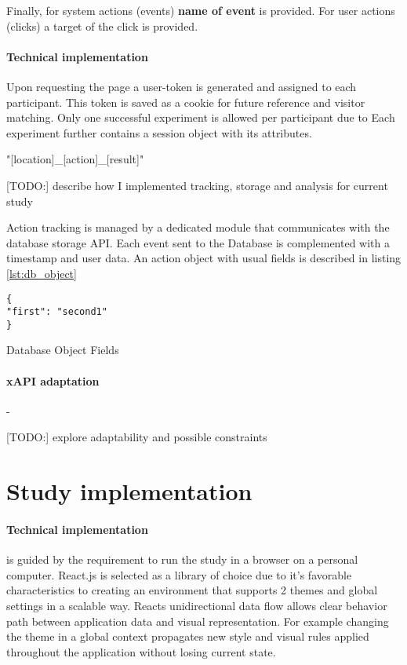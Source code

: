 	Finally, for system actions (events) \textbf{name of event} is provided. For user actions (clicks) a target of the click is provided.
	

	

		
		\paragraph{Technical implementation}
		
		Upon requesting the page a user-token is generated and assigned to each participant. This token is saved as a cookie for future reference and visitor matching. Only one successful experiment is allowed per participant due to 
		Each experiment further contains a session object with its attributes. 
		
		"[location]\_[action]\_[result]"
		
		[TODO:] describe how I implemented tracking, storage and analysis for current study
		
		Action tracking is managed by a dedicated module that communicates with the database storage API. Each event sent to the Database is complemented with a timestamp and user data. An action object with usual fields is described in listing \ref{lst:db_object}


	\begin{listing}[H]
		\begin{verbatim}
{
"first": "second1"
}
		\end{verbatim}
		\caption{Database Object Fields}
		\label{lst:db_object}
	\end{listing}


		
		\paragraph{xAPI adaptation} - 
		
		[TODO:] explore adaptability and possible constraints

\section{Study implementation}



\paragraph{Technical implementation} is guided by the requirement to run the study in a browser on a personal computer. React.js is selected as a library of choice due to it's favorable characteristics to creating an environment that supports 2 themes and global settings in a scalable way. Reacts unidirectional data flow
allows clear behavior path between application data and visual representation. For example changing the theme in a global context propagates new style and visual rules applied throughout the application without losing current state.

